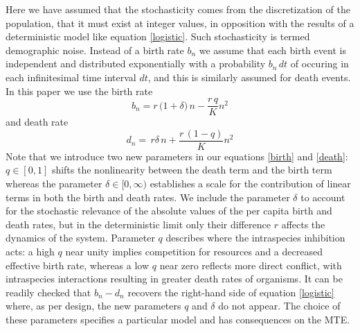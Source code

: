 Here we have assumed that the stochasticity comes from the discretization of the population, that it must exist at integer values, in opposition with the results of a deterministic model like equation \ref{logistic}.
Such stochasticity is termed demographic noise.
Instead of a birth rate $b_n$ we assume that each birth event is independent and distributed exponentially with a probability $b_n\,dt$ of occuring in each infinitesimal time interval $dt$, and this is similarly assumed for death events. %
In this paper we use the birth rate
\begin{equation}
 b_n = r\,\Big(1 + \delta\Big)\,n - \frac{r\,q}{K}n^2%
\label{birth}
\end{equation}
and death rate
\begin{equation}
 d_n = \,r\delta\,n + \frac{r\,(1-q)}{K} n^2
\label{death}
\end{equation}
Note that we introduce two new parameters in our equations \ref{birth} and \ref{death}: $q\in[0,1]$ shifts the nonlinearity between the death term and the birth term whereas the parameter $\delta\in[0,\infty)$ establishes a scale for the contribution of linear terms in both the birth and death rates.
We include the parameter $\delta$ to account for the stochastic relevance of the absolute values of the per capita birth and death rates, but in the deterministic limit only their difference $r$ affects the dynamics of the system.
Parameter $q$ describes where the intraspecies inhibition acts: a high $q$ near unity implies competition for resources and a decreased effective birth rate, whereas a low $q$ near zero reflects more direct conflict, with intraspecies interactions resulting in greater death rates of organisms.
It can be readily checked that $b_n-d_n$ recovers the right-hand side of equation \ref{logistic} where, as per design, the new parameters $q$ and $\delta$ do not appear.
The choice of these parameters specifies a particular model and has consequences on the MTE.


